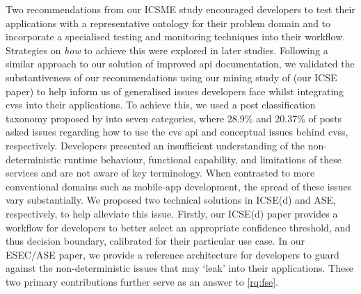 Two recommendations from our ICSME study encouraged developers to test their applications with a representative ontology for their problem domain and to incorporate a specialised testing and monitoring techniques into their workflow. Strategies on \textit{how} to achieve this were explored in later studies.  Following a similar approach to our solution of improved \gls{api} documentation, we validated the substantiveness of our recommendations using our mining study of  (our ICSE paper) to help inform us of generalised issues developers face whilst integrating \glspl{cvs} into their applications. To achieve this, we used a  post classification taxonomy proposed by \citet{Beyer:2018fm} into seven categories, where 28.9\% and 20.37\% of posts asked issues regarding how to use the \gls{cvs} \gls{api} and conceptual issues behind \glspl{cvs}, respectively. Developers presented an insufficient understanding of the non-deterministic runtime behaviour, functional capability, and limitations of these services and are not aware of key  terminology. When contrasted to more conventional domains such as mobile-app development, the spread of these issues vary substantially. We proposed two technical solutions in ICSE(d) and ASE, respectively, to help alleviate this issue.  Firstly, our ICSE(d) paper provides a workflow for developers to better select an appropriate confidence threshold, and thus decision boundary, calibrated for their particular use case. In our ESEC/ASE paper, we provide a reference architecture for developers to guard against the non-deterministic issues that may `leak' into their applications. These two primary contributions further serve as an answer to \ref{rq:fse}.


